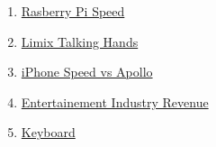 \begin{enumerate}
\item \href {https://www.deviceplus.com/raspberry-pi/raspberry-pi-tech-vs-computers/}{Rasberry Pi Speed} 

 
\item \href {https://cordis.europa.eu/project/id/808764}{Limix Talking Hands} 

\item \href {https://www.realclearscience.com/articles/2019/07/02/your_mobile_phone_vs_apollo_11s_guidance_computer_111026.html#:~:text=Phone%
4}{iPhone Speed vs Apollo } 





\item \href {https://www.statista.com/statistics/237749/value-of-the-global-entertainment-and-media-market/}{Entertainement Industry Revenue} 


\item \href {https://www.forbes.com/sites/quora/2019/01/10/why-was-the-qwerty-keyboard-layout-invented/?sh=6320e99657ae}{Keyboard} 




\end{enumerate}










 






